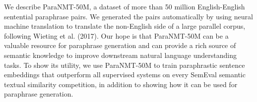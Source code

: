 We describe ParaNMT-50M, a dataset of more than 50 million English-English sentential paraphrase pairs. We generated the pairs automatically by using neural machine translation to translate the non-English side of a large parallel corpus, following Wieting et al. (2017). Our hope is that ParaNMT-50M can be a valuable resource for paraphrase generation and can provide a rich source of semantic knowledge to improve downstream natural language understanding tasks. To show its utility, we use ParaNMT-50M to train paraphrastic sentence embeddings that outperform all supervised systems on every SemEval semantic textual similarity competition, in addition to showing how it can be used for paraphrase generation.
